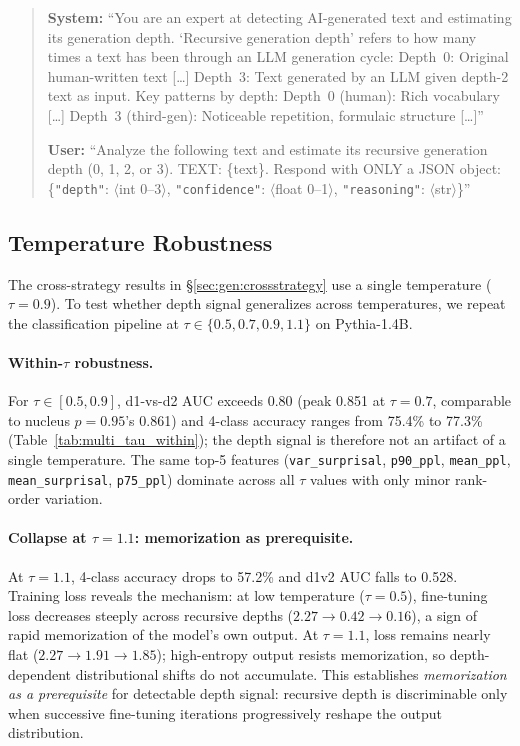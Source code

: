 \begin{quote}
\small
\textbf{System:} ``You are an expert at detecting AI-generated text and estimating its generation depth. `Recursive generation depth' refers to how many times a text has been through an LLM generation cycle: Depth~0: Original human-written text [\ldots] Depth~3: Text generated by an LLM given depth-2 text as input. Key patterns by depth: Depth~0 (human): Rich vocabulary [\ldots] Depth~3 (third-gen): Noticeable repetition, formulaic structure [\ldots]''

\textbf{User:} ``Analyze the following text and estimate its recursive generation depth (0, 1, 2, or 3). TEXT: \{text\}. Respond with ONLY a JSON object: \{\texttt{"depth"}: $\langle$int 0--3$\rangle$, \texttt{"confidence"}: $\langle$float 0--1$\rangle$, \texttt{"reasoning"}: $\langle$str$\rangle$\}''
\end{quote}

\subsection{Temperature Robustness}
\label{app:multi_tau}

The cross-strategy results in \S\ref{sec:gen:crossstrategy} use a single temperature ($\tau{=}0.9$).
To test whether depth signal generalizes across temperatures, we repeat the classification pipeline at $\tau \in \{0.5, 0.7, 0.9, 1.1\}$ on Pythia-1.4B.

\paragraph{Within-$\tau$ robustness.}
For $\tau \in [0.5, 0.9]$, d1-vs-d2 AUC exceeds 0.80 (peak 0.851 at $\tau{=}0.7$, comparable to nucleus $p{=}0.95$'s 0.861) and 4-class accuracy ranges from 75.4\% to 77.3\% (Table~\ref{tab:multi_tau_within}); the depth signal is therefore not an artifact of a single temperature.
The same top-5 features (\texttt{var\_surprisal}, \texttt{p90\_ppl}, \texttt{mean\_ppl}, \texttt{mean\_surprisal}, \texttt{p75\_ppl}) dominate across all $\tau$ values with only minor rank-order variation.

\paragraph{Collapse at $\tau{=}1.1$: memorization as prerequisite.}
At $\tau{=}1.1$, 4-class accuracy drops to 57.2\% and d1v2 AUC falls to 0.528.
Training loss reveals the mechanism: at low temperature ($\tau{=}0.5$), fine-tuning loss decreases steeply across recursive depths ($2.27 \to 0.42 \to 0.16$), a sign of rapid memorization of the model's own output.
At $\tau{=}1.1$, loss remains nearly flat ($2.27 \to 1.91 \to 1.85$); high-entropy output resists memorization, so depth-dependent distributional shifts do not accumulate.
This establishes \emph{memorization as a prerequisite} for detectable depth signal: recursive depth is discriminable only when successive fine-tuning iterations progressively reshape the output distribution.

